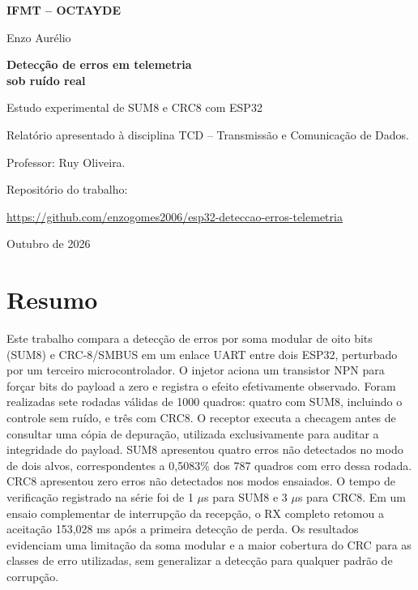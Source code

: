 \documentclass[12pt,a4paper]{article}
\begin{document}
\hypersetup{pageanchor=false}
\begin{titlepage}
\centering
{\large\bfseries IFMT -- OCTAYDE\par}
\vspace{1.8cm}
{\large Enzo Aurélio\par}
\vfill
{\LARGE\bfseries Detecção de erros em telemetria\\[0.3em]sob ruído real\par}
\vspace{0.6cm}
{\large Estudo experimental de SUM8 e CRC8 com ESP32\par}
\vspace{2cm}
\begin{flushright}
\begin{minipage}{0.58\textwidth}
Relatório apresentado à disciplina TCD -- Transmissão e Comunicação de Dados.\par
\vspace{0.8em}
Professor: Ruy Oliveira.
\end{minipage}
\end{flushright}
\vfill
{\small Repositório do trabalho:\par\url{https://github.com/enzogomes2006/esp32-deteccao-erros-telemetria}\par}
\vspace{0.8cm}
Outubro de 2026
\end{titlepage}
\hypersetup{pageanchor=true}
\section*{Resumo}
Este trabalho compara a detecção de erros por soma modular de oito bits (SUM8) e CRC-8/SMBUS em um enlace UART entre dois ESP32, perturbado por um terceiro microcontrolador. O injetor aciona um transistor NPN para forçar bits do payload a zero e registra o efeito efetivamente observado. Foram realizadas sete rodadas válidas de 1000 quadros: quatro com SUM8, incluindo o controle sem ruído, e três com CRC8. O receptor executa a checagem antes de consultar uma cópia de depuração, utilizada exclusivamente para auditar a integridade do payload. SUM8 apresentou quatro erros não detectados no modo de dois alvos, correspondentes a 0,5083\% dos 787 quadros com erro dessa rodada. CRC8 apresentou zero erros não detectados nos modos ensaiados. O tempo de verificação registrado na série foi de 1 \ensuremath{\mu}s para SUM8 e 3 \ensuremath{\mu}s para CRC8. Em um ensaio complementar de interrupção da recepção, o RX completo retomou a aceitação 153,028 ms após a primeira detecção de perda. Os resultados evidenciam uma limitação da soma modular e a maior cobertura do CRC para as classes de erro utilizadas, sem generalizar a detecção para qualquer padrão de corrupção.
\end{document}

